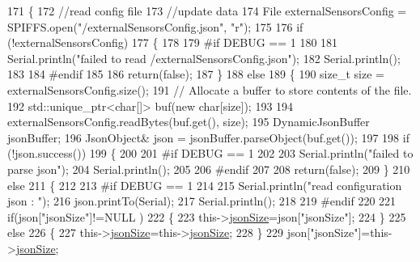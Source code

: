 \begin{DoxyCode}
171 \{
172     \textcolor{comment}{//read config file}
173     \textcolor{comment}{//update data}
174     File externalSensorsConfig = SPIFFS.open(\textcolor{stringliteral}{"/externalSensorsConfig.json"}, \textcolor{stringliteral}{"r"});
175 
176     \textcolor{keywordflow}{if} (!externalSensorsConfig) 
177     \{
178     
179 \textcolor{preprocessor}{    #if DEBUG == 1}
180         
181         Serial.println(\textcolor{stringliteral}{"failed to read /externalSensorsConfig.json"});
182         Serial.println();
183     
184 \textcolor{preprocessor}{    #endif}
185         
186         \textcolor{keywordflow}{return}(\textcolor{keyword}{false});
187     \}
188     \textcolor{keywordflow}{else}
189     \{
190         \textcolor{keywordtype}{size\_t} size = externalSensorsConfig.size();
191         \textcolor{comment}{// Allocate a buffer to store contents of the file.}
192         std::unique\_ptr<char[]> buf(\textcolor{keyword}{new} \textcolor{keywordtype}{char}[size]);
193 
194         externalSensorsConfig.readBytes(buf.get(), size);
195         DynamicJsonBuffer jsonBuffer;
196         JsonObject& json = jsonBuffer.parseObject(buf.get());
197 
198         \textcolor{keywordflow}{if} (!json.success()) 
199         \{
200         
201 \textcolor{preprocessor}{        #if DEBUG == 1 }
202 
203             Serial.println(\textcolor{stringliteral}{"failed to parse json"});
204             Serial.println();
205         
206 \textcolor{preprocessor}{        #endif}
207 
208             \textcolor{keywordflow}{return}(\textcolor{keyword}{false});
209         \} 
210         \textcolor{keywordflow}{else}
211         \{
212         
213 \textcolor{preprocessor}{        #if DEBUG == 1 }
214     
215             Serial.println(\textcolor{stringliteral}{"read configuration json : "});
216             json.printTo(Serial);
217             Serial.println();
218         
219 \textcolor{preprocessor}{        #endif}
220 
221             \textcolor{keywordflow}{if}(json[\textcolor{stringliteral}{"jsonSize"}]!=NULL )
222             \{           
223                 this->\hyperlink{classExternalSensors_acacea86d74d967b57fcff282d26cff57}{jsonSize}=json[\textcolor{stringliteral}{"jsonSize"}];
224             \}
225             \textcolor{keywordflow}{else}
226             \{
227                 this->\hyperlink{classExternalSensors_acacea86d74d967b57fcff282d26cff57}{jsonSize}=this->\hyperlink{classExternalSensors_acacea86d74d967b57fcff282d26cff57}{jsonSize};
228             \}
229             json[\textcolor{stringliteral}{"jsonSize"}]=this->\hyperlink{classExternalSensors_acacea86d74d967b57fcff282d26cff57}{jsonSize};            

\end{DoxyCode}
